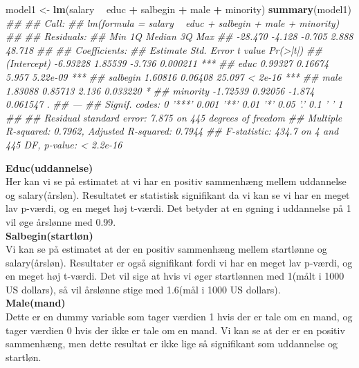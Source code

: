 \documentclass[
  10pt,
]{article}
\newenvironment{Shaded}{\begin{snugshade}}{\end{snugshade}}
\newcommand{\CommentTok}[1]{\textcolor[rgb]{0.56,0.35,0.01}{\textit{#1}}}
\newcommand{\KeywordTok}[1]{\textcolor[rgb]{0.13,0.29,0.53}{\textbf{#1}}}
\newcommand{\NormalTok}[1]{#1}
\newcommand{\OperatorTok}[1]{\textcolor[rgb]{0.81,0.36,0.00}{\textbf{#1}}}
\newcommand{\StringTok}[1]{\textcolor[rgb]{0.31,0.60,0.02}{#1}}
\begin{document}
\begin{Shaded}
\begin{Highlighting}[]
\NormalTok{model1 <-}\StringTok{ }\KeywordTok{lm}\NormalTok{(salary }\OperatorTok{~}\StringTok{ }\NormalTok{educ }\OperatorTok{+}\StringTok{ }\NormalTok{salbegin }\OperatorTok{+}\StringTok{ }\NormalTok{male }\OperatorTok{+}\StringTok{ }\NormalTok{minority)}
\KeywordTok{summary}\NormalTok{(model1)}
\CommentTok{## }
\CommentTok{## Call:}
\CommentTok{## lm(formula = salary ~ educ + salbegin + male + minority)}
\CommentTok{## }
\CommentTok{## Residuals:}
\CommentTok{##     Min      1Q  Median      3Q     Max }
\CommentTok{## -28.470  -4.128  -0.705   2.888  48.718 }
\CommentTok{## }
\CommentTok{## Coefficients:}
\CommentTok{##             Estimate Std. Error t value Pr(>|t|)    }
\CommentTok{## (Intercept) -6.93228    1.85539  -3.736 0.000211 ***}
\CommentTok{## educ         0.99327    0.16674   5.957 5.22e-09 ***}
\CommentTok{## salbegin     1.60816    0.06408  25.097  < 2e-16 ***}
\CommentTok{## male         1.83088    0.85713   2.136 0.033220 *  }
\CommentTok{## minority    -1.72539    0.92056  -1.874 0.061547 .  }
\CommentTok{## ---}
\CommentTok{## Signif. codes:  0 '***' 0.001 '**' 0.01 '*' 0.05 '.' 0.1 ' ' 1}
\CommentTok{## }
\CommentTok{## Residual standard error: 7.875 on 445 degrees of freedom}
\CommentTok{## Multiple R-squared:  0.7962, Adjusted R-squared:  0.7944 }
\CommentTok{## F-statistic: 434.7 on 4 and 445 DF,  p-value: < 2.2e-16}
\end{Highlighting}
\end{Shaded}

\textbf{Educ(uddannelse)}\\
Her kan vi se på estimatet at vi har en positiv sammenhæng mellem
uddannelse og salary(årsløn). Resultatet er statistisk signifikant da vi
kan se vi har en meget lav p-værdi, og en meget høj t-værdi. Det betyder
at en øgning i uddannelse på 1 vil øge årslønne med 0.99.\\
\newpage \textbf{Salbegin(startløn)}\\
Vi kan se på estimatet at der en positiv sammenhæng mellem startlønne og
salary(årsløn). Resultater er også signifikant fordi vi har en meget lav
p-værdi, og en meget høj t-værdi. Det vil sige at hvis vi øger
startlønnen med 1(målt i 1000 US dollars), så vil årslønne stige med
1.6(mål i 1000 US dollars).\\

\textbf{Male(mand)}\\
Dette er en dummy variable som tager værdien 1 hvis der er tale om en
mand, og tager værdien 0 hvis der ikke er tale om en mand. Vi kan se at
der er en positiv sammenhæng, men dette resultat er ikke lige så
signifikant som uddannelse og startløn.\\
\end{document}
